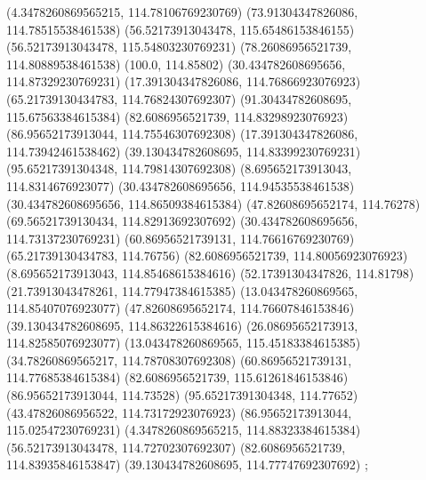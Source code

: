 {{{		(4.3478260869565215, 114.78106769230769)
		(73.91304347826086, 114.78515538461538)
		(56.52173913043478, 115.65486153846155)
		(56.52173913043478, 115.54803230769231)
		(78.26086956521739, 114.80889538461538)
		(100.0, 114.85802)
		(30.434782608695656, 114.87329230769231)
		(17.391304347826086, 114.76866923076923)
		(65.21739130434783, 114.76824307692307)
		(91.30434782608695, 115.67563384615384)
		(82.6086956521739, 114.83298923076923)
		(86.95652173913044, 114.75546307692308)
		(17.391304347826086, 114.73942461538462)
		(39.130434782608695, 114.83399230769231)
		(95.65217391304348, 114.79814307692308)
		(8.695652173913043, 114.8314676923077)
		(30.434782608695656, 114.94535538461538)
		(30.434782608695656, 114.86509384615384)
		(47.82608695652174, 114.76278)
		(69.56521739130434, 114.82913692307692)
		(30.434782608695656, 114.73137230769231)
		(60.86956521739131, 114.76616769230769)
		(65.21739130434783, 114.76756)
		(82.6086956521739, 114.80056923076923)
		(8.695652173913043, 114.85468615384616)
		(52.17391304347826, 114.81798)
		(21.73913043478261, 114.77947384615385)
		(13.043478260869565, 114.85407076923077)
		(47.82608695652174, 114.76607846153846)
		(39.130434782608695, 114.86322615384616)
		(26.08695652173913, 114.82585076923077)
		(13.043478260869565, 115.45183384615385)
		(34.78260869565217, 114.78708307692308)
		(60.86956521739131, 114.77685384615384)
		(82.6086956521739, 115.61261846153846)
		(86.95652173913044, 114.73528)
		(95.65217391304348, 114.77652)
		(43.47826086956522, 114.73172923076923)
		(86.95652173913044, 115.02547230769231)
		(4.3478260869565215, 114.88323384615384)
		(56.52173913043478, 114.72702307692307)
		(82.6086956521739, 114.83935846153847)
		(39.130434782608695, 114.77747692307692)
	};

}}
